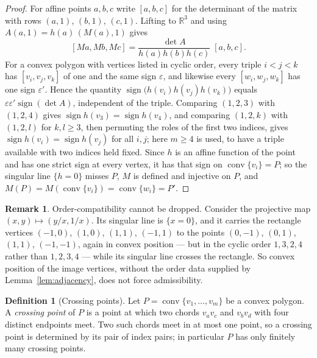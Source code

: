 \documentclass[11pt]{amsart}
\theoremstyle{definition}
\newtheorem{definition}[theorem]{Definition}
\newtheorem{remark}[theorem]{Remark}
\newcommand{\R}{\mathbb{R}}
\newcommand{\conv}{\operatorname{conv}}
\begin{document}
\begin{proof}
For affine points $a,b,c$ write $[a,b,c]$ for the determinant of the
matrix with rows $(a,1)$, $(b,1)$, $(c,1)$. Lifting to $\R^3$ and
using $A(a,1)=h(a)\,(M(a),1)$ gives
\[
[Ma,Mb,Mc]=\frac{\det A}{h(a)h(b)h(c)}\;[a,b,c].
\]
For a convex polygon with vertices listed in cyclic order, every triple
$i<j<k$ has $[v_i,v_j,v_k]$ of one and the same sign $\varepsilon$, and
likewise every $[w_i,w_j,w_k]$ has one sign $\varepsilon'$. Hence the
quantity $\operatorname{sign}\bigl(h(v_i)h(v_j)h(v_k)\bigr)$ equals
$\varepsilon\varepsilon'\operatorname{sign}(\det A)$, independent of
the triple. Comparing $(1,2,3)$ with $(1,2,4)$ gives
$\operatorname{sign}h(v_3)=\operatorname{sign}h(v_4)$, and comparing
$(1,2,k)$ with $(1,2,l)$ for $k,l\ge3$, then permuting the roles of the
first two indices, gives $\operatorname{sign}h(v_i)=\operatorname{sign}h(v_j)$
for all $i,j$; here $m\ge4$ is used, to have a triple available with two
indices held fixed. Since $h$ is an affine function of the point and has one
strict sign at every vertex, it has that sign on $\conv\{v_i\}=P$; so the
singular line $\{h=0\}$ misses $P$, $M$ is defined and injective on $P$, and
$M(P)=M(\conv\{v_i\})=\conv\{w_i\}=P'$.
\end{proof}

\begin{remark}\label{rem:order-needed}
Order-compatibility cannot be dropped. Consider the projective map
$(x,y)\mapsto(y/x,1/x)$. Its singular line is $\{x=0\}$, and it carries the
rectangle vertices $(-1,0)$, $(1,0)$, $(1,1)$, $(-1,1)$ to the points
$(0,-1)$, $(0,1)$, $(1,1)$, $(-1,-1)$, again in convex position --- but
in the cyclic order $1,3,2,4$ rather than $1,2,3,4$ --- while its singular
line crosses the rectangle. So convex position of the image vertices, without
the order data supplied by Lemma~\ref{lem:adjacency}, does not force
admissibility.
\end{remark}

\begin{definition}[Crossing points]\label{def:crossing}
Let $P=\conv\{v_1,\dots,v_m\}$ be a convex polygon. A \emph{crossing point} of
$P$ is a point at which two chords $v_av_c$ and $v_bv_d$ with four distinct
endpoints meet. Two such chords meet in at most one point, so a crossing point
is determined by its pair of index pairs; in particular $P$ has only finitely
many crossing points.
\end{definition}
\end{document}
